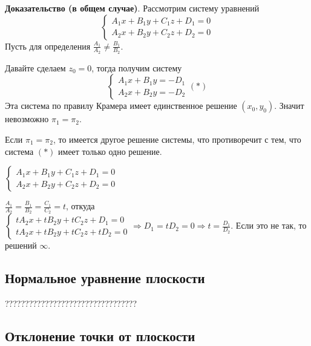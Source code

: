 \documentclass[a4paper]{article}
\begin{document}
\begin{hproof}
\textbf{Доказательство (в общем случае)}. Рассмотрим систему уравнений
\begin{equation}
\begin{cases}
   A_1x+B_1y+C_1z+D_1 = 0
   \\
   A_2x+B_2y+C_2z+D_2 = 0
 \end{cases}
\end{equation}
Пусть для определения $\displaystyle \frac{A_1}{A_2} \neq \frac{B_1}{B_2}$.

Давайте сделаем $z_0=0$, тогда получим систему \begin{equation}
\begin{cases}
   A_1x+B_1y = -D_1
   \\
   A_2x+B_2y= -D_2
 \end{cases} (*)
\end{equation}
Эта система по правилу Крамера имеет единственное решение $(x_0, y_0)$. Значит невозможно $\pi_1 = \pi_2$.

Если $\pi_1 = \pi_2$, то имеется другое решение системы, что противоречит с тем, что система $(*)$ имеет только одно решение.

$\begin{cases}
   A_1x+B_1y+C_1z+D_1 = 0
   \\
   A_2x+B_2y+C_2z+D_2 = 0
 \end{cases}$
 
$\displaystyle \frac{A_1}{A_2} = \frac{B_1}{B_2} = \frac{C_1}{C_2} = t$, откуда $\begin{cases}
   tA_2x+tB_2y+tC_2z+D_1 = 0
   \\
   tA_2x+tB_2y+tC_2z+tD_2 = 0
 \end{cases} \Rightarrow D_1 = tD_2 = 0 \Rightarrow \displaystyle t = \frac{D_1}{D_2}$. Если это не так, то решений $\infty$.
\end{hproof} 
 
 
\newpage \begin{center}\begin{Large}\end{Large}\end{center}
\subsection*{Нормальное уравнение плоскости}

?????????????????????????????????

\subsection*{Отклонение точки от плоскости}
\end{document}

